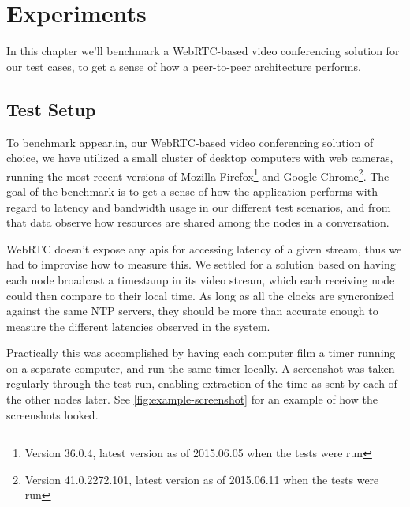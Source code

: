\chapter{Experiments}\label{chp:experiments}

In this chapter we'll benchmark a WebRTC-based video conferencing solution for our test cases, to get a sense of how a peer-to-peer architecture performs.


\section{Test Setup}

To benchmark appear.in, our WebRTC-based video conferencing solution of choice, we have utilized a small cluster of desktop computers with web cameras, running the most recent versions of Mozilla Firefox\footnote{Version 36.0.4, latest version as of 2015.06.05 when the tests were run} and Google Chrome\footnote{Version 41.0.2272.101, latest version as of 2015.06.11 when the tests were run}. The goal of the benchmark is to get a sense of how the application performs with regard to latency and bandwidth usage in our different test scenarios, and from that data observe how resources are shared among the nodes in a conversation.


WebRTC doesn't expose any \glspl{api} for accessing latency of a given stream, thus we had to improvise how to measure this. We settled for a solution based on having each node broadcast a timestamp in its video stream, which each receiving node could then compare to their local time. As long as all the clocks are syncronized against the same NTP servers, they should be more than accurate enough to measure the different latencies observed in the system.

Practically this was accomplished by having each computer film a timer running on a separate computer, and run the same timer locally. A screenshot was taken regularly through the test run, enabling extraction of the time as sent by each of the other nodes later. See \autoref{fig:example-screenshot} for an example of how the screenshots looked.


